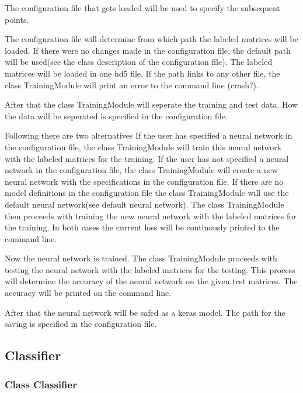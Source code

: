 \documentclass[parskip=full]{scrartcl}
\begin{document}
The configuration file that gets loaded will be used to specify the subsequent points.\newline

The configuration file will determine from which path the labeled matrices will be loaded.
If there were no changes made in the configuration file, the default path will be used(see the class description of the configuration file).
The labeled matrices will be loaded in one hd5 file. If the path links to any other file, the class TrainingModule will print an error to the command line (crash?). \newline

After that the class TrainingModule will seperate the training and test data.
How the data will be seperated is specified in the configuration file.\newline

Following there are two alternatives
 If the user has specified a neural network in the configuration file, the class TrainingModule will train this neural network with the labeled matrices for the training.
If the user has not specified a neural network in the configuration file, the class TrainingModule will create a new neural network with the specifications in the configuration file.
If there are no model definitions in the configuration file the class TrainingModule will use the default neural network(see default neural network).
The class TrainingModule then proceeds with training the new neural network with the labeled matrices for the training. In both cases the current loss will be continously printed to the command line.\newline

Now the neural network is trained. The class TrainingModule proceeds with testing the neural network with the labeled matrices for the testing.
This process will determine the accuracy of the neural network on the given test matrices.
The accuracy will be printed on the command line.\newline

After that the neural network will be safed as a keras model.
The path for the saving is specified in the configuration file.




\subsection{Classifier}
\subsubsection{Class Classifier}
\end{document}
